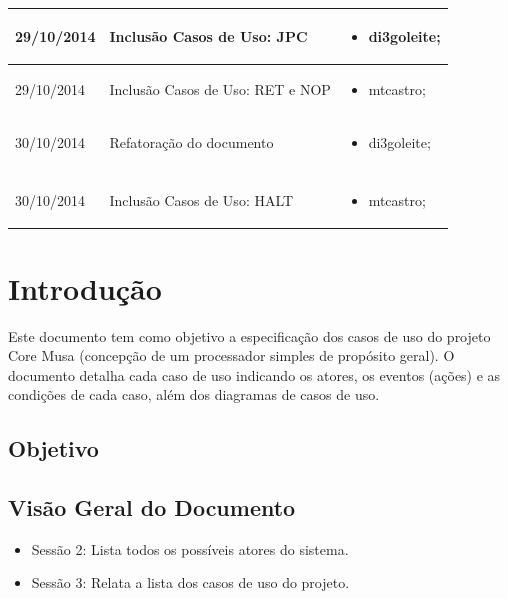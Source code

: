 \documentclass{article}
\begin{document}
\begin{table}[ht]
\begin{tabular}[pos]{|m{2cm} | m{7.2cm} | m{3.8cm}|}
	  \small 29/10/2014 & \small Inclusão Casos de Uso: JPC & \small 
	  \begin{itemize}
	  	\item di3goleite; 
	  \end{itemize}  
	  \\ \hline
	  
	  \small 29/10/2014 & \small Inclusão Casos de Uso: RET e NOP & \small 
      \begin{itemize}
      	\item mtcastro; 
	  \end{itemize}  
	  \\ \hline
	  
	  \small 30/10/2014 & \small Refatoração do documento & \small 
	  \begin{itemize}
	  	\item di3goleite; 
	  \end{itemize}  
	  \\ \hline
	  
	  \\ \hline
	  
	  \small 30/10/2014 & \small Inclusão Casos de Uso: HALT & \small 
      \begin{itemize}
      	\item mtcastro; 
	  \end{itemize}
	  
    \end{tabular}
  \end{table}

\newpage

\tableofcontents
\newpage

\section{Introdução}
Este documento tem como objetivo a especificação dos casos de uso do projeto Core Musa (concepção de um processador simples de propósito geral). O documento detalha cada caso de uso indicando os atores, os eventos (ações) e as condições de cada caso, além dos diagramas de casos de uso.

  \subsection{Objetivo}
  
  \subsection{Visão Geral do Documento}
  \begin{itemize}
    \item Sessão 2: Lista todos os possíveis atores do sistema.
    \item Sessão 3: Relata a lista dos casos de uso do projeto.
  \end{itemize}
  
\end{document}
